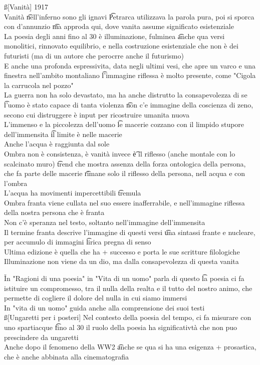 \documentclass[12pt]{article}
\begin{document}
\ss[Vanità]
1917 \\
Vanità \t nell'inferno sono gli ignavi \t Petrarca utilizzava la parola pura, poi si sporca con d'annunzio \t ma approda qui, dove vanita assume significato esistenziale \\
La poesia degli anni fino al 30 è illuminazione, fulminea \t anche qua versi monolitici, rinnovato equilibrio, e nella costruzione esistenziale che non è dei futuristi (ma di un autore che perocrre anche il futurismo) \\
E anche una profonda espressivita, data negli ultimi vesi, che apre un varco e una finestra nell'ambito montaliano \t l'immagine riflessa è molto presente, come "Cigola la carrucola nel pozzo" \\
La guerra non ha solo devastato, ma ha anche distrutto la consapevolezza di se \t l'uomo è stato capace di tanta violenza \t non c'e immagine della coscienza di zeno, secono cui distruggere è input per ricostruire umanita nuova \\
L'immenso e la piccolezza dell'uomo \t le macerie cozzano con il limpido stupore dell'immensita \t il limite è nelle macerie \\
Anche l'acqua è raggiunta dal sole \\
Ombra non è consistenza, è vanità invece \t è il riflesso (anche montale con lo scalcinato muro) \t trend che mostra assenza della forza ontologica della persona, che fa parte delle macerie \t rimane solo il riflesso della persona, nell acqua e con l'ombra \\
L'acqua ha movimenti impercettibili \t tremula \\
Ombra franta viene cullata nel suo essere inafferrabile, e nell'immagine riflessa della nostra persona che è franta \\
Non c'è speranza nel testo, soltanto nell'immagine dell'immensita \\
Il termine franta descrive l'immagine di questi versi \t una sintassi frante e nucleare, per accumulo di immagini \t lirica pregna di senso \\
Ultima edizione è quella che ha + successo e porta le sue scritture filologiche \\
Illuminazione non viene da un dio, ma dalla consapevolezza di questa vanita

\v

In "Ragioni di una poesia" in "Vita di un uomo" parla di questo \t la poesia ci fa istituire un compromesso, tra il nulla della realta e il tutto del nostro animo, che permette di cogliere il dolore del nulla in cui siamo immersi \\
In "vita di un uomo" guida anche alla comprensione dei suoi testi \\
\ss[Ungaretti per i posteri]
Nel contesto della poesia del tempo, ci fa misurare con uno spartiacque \t fino al 30 il ruolo della poesia ha significativtà che non puo prescindere da ungaretti \\
Anche dopo il fenomeno della WW2 \t anche se qua si ha una esigenza + prosastica, che è anche abbinata alla cinematografia
\end{document}
